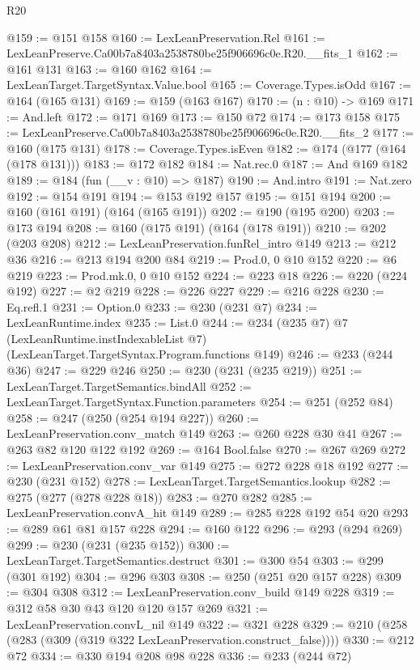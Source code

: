 \begin{lexlean}{R20}
\begin{coremodule}
@159 := @151 @158
@160 := LexLeanPreservation.Rel
@161 := LexLeanPreserve.Ca00b7a8403a2538780be25f906696c0e.R20.__fits_1
@162 := @161 @131
@163 := @160 @162
@164 := LexLeanTarget.TargetSyntax.Value.bool
@165 := Coverage.Types.isOdd
@167 := @164 (@165 @131)
@169 := @159 (@163 @167)
@170 := (n : @10) -> @169
@171 := And.left
@172 := @171 @169
@173 := @150 @72
@174 := @173 @158
@175 := LexLeanPreserve.Ca00b7a8403a2538780be25f906696c0e.R20.__fits_2
@177 := @160 (@175 @131)
@178 := Coverage.Types.isEven
@182 := @174 (@177 (@164 (@178 @131)))
@183 := @172 @182
@184 := Nat.rec.{0}
@187 := And @169 @182
@189 := @184 (fun (__v : @10) => @187)
@190 := And.intro
@191 := Nat.zero
@192 := @154 @191
@194 := @153 @192 @157
@195 := @151 @194
@200 := @160 (@161 @191) (@164 (@165 @191))
@202 := @190 (@195 @200)
@203 := @173 @194
@208 := @160 (@175 @191) (@164 (@178 @191))
@210 := @202 (@203 @208)
@212 := LexLeanPreservation.funRel_intro @149
@213 := @212 @36
@216 := @213 @194 @200 @84
@219 := Prod.{0, 0} @10 @152
@220 := @6 @219
@223 := Prod.mk.{0, 0} @10 @152
@224 := @223 @18
@226 := @220 (@224 @192)
@227 := @2 @219
@228 := @226 @227
@229 := @216 @228
@230 := Eq.refl.{1}
@231 := Option.{0}
@233 := @230 (@231 @7)
@234 := LexLeanRuntime.index
@235 := List.{0}
@244 := @234
    (@235 @7)
    @7
    (LexLeanRuntime.instIndexableList @7)
    (LexLeanTarget.TargetSyntax.Program.functions @149)
@246 := @233 (@244 @36)
@247 := @229 @246
@250 := @230 (@231 (@235 @219))
@251 := LexLeanTarget.TargetSemantics.bindAll
@252 := LexLeanTarget.TargetSyntax.Function.parameters
@254 := @251 (@252 @84)
@258 := @247 (@250 (@254 @194 @227))
@260 := LexLeanPreservation.conv_match @149
@263 := @260 @228 @30 @41
@267 := @263 @82 @120 @122 @192
@269 := @164 Bool.false
@270 := @267 @269
@272 := LexLeanPreservation.conv_var @149
@275 := @272 @228 @18 @192
@277 := @230 (@231 @152)
@278 := LexLeanTarget.TargetSemantics.lookup
@282 := @275 (@277 (@278 @228 @18))
@283 := @270 @282
@285 := LexLeanPreservation.convA_hit @149
@289 := @285 @228 @192 @54 @20
@293 := @289 @61 @81 @157 @228
@294 := @160 @122
@296 := @293 (@294 @269)
@299 := @230 (@231 (@235 @152))
@300 := LexLeanTarget.TargetSemantics.destruct
@301 := @300 @54
@303 := @299 (@301 @192)
@304 := @296 @303
@308 := @250 (@251 @20 @157 @228)
@309 := @304 @308
@312 := LexLeanPreservation.conv_build @149 @228
@319 := @312 @58 @30 @43 @120 @120 @157 @269
@321 := LexLeanPreservation.convL_nil @149
@322 := @321 @228
@329 := @210 (@258 (@283 (@309 (@319 @322 LexLeanPreservation.construct_false))))
@330 := @212 @72
@334 := @330 @194 @208 @98 @228
@336 := @233 (@244 @72)

\end{coremodule}
\end{lexlean}
